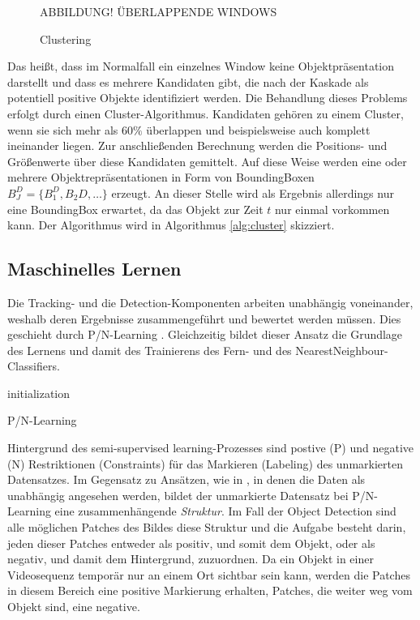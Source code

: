 	\begin{figure}
		\begin{centering}
			ABBILDUNG! ÜBERLAPPENDE WINDOWS
			\caption{Clustering}
			\label{abb:cluster}
			\par
		\end{centering}
	\end{figure}

	Das heißt, dass im Normalfall ein einzelnes Window keine Objektpräsentation darstellt und dass es mehrere Kandidaten gibt, die nach der Kaskade als potentiell positive Objekte identifiziert werden. Die Behandlung dieses Problems erfolgt durch einen Cluster-Algorithmus. Kandidaten gehören zu einem Cluster, wenn sie sich mehr als $60\%$ überlappen und beispielsweise auch komplett ineinander liegen. Zur anschließenden Berechnung werden die Positions- und Größenwerte über diese Kandidaten gemittelt. Auf diese Weise werden eine oder mehrere Objektrepräsentationen in Form von BoundingBoxen $B_J^D = \{B_1^D, B_2D, \dots\}$ erzeugt. An dieser Stelle wird als Ergebnis allerdings nur eine BoundingBox erwartet, da das Objekt zur Zeit $t$ nur einmal vorkommen kann. Der Algorithmus wird in Algorithmus \ref{alg:cluster} skizziert.

	\subsection{Maschinelles Lernen}
	\label{subsection:machine_learning}
	Die Tracking- und die Detection-Komponenten arbeiten unabhängig voneinander, weshalb deren Ergebnisse zusammengeführt und bewertet werden müssen. Dies geschieht durch P/N-Learning \cite{PNL}. Gleichzeitig bildet dieser Ansatz die Grundlage des Lernens und damit des Trainierens
	des Fern- und des NearestNeighbour-Classifiers.

	\begin{algorithm}
	\vspace{0.2cm}
	initialization\;
	\caption{P/N-Learning}
	\label{alg:learning}
	\vspace{0.2cm}
	\end{algorithm}

	Hintergrund des semi-supervised learning-Prozesses sind postive (P)	und negative (N) Restriktionen (Constraints) für das Markieren (Labeling)	des unmarkierten Datensatzes. Im Gegensatz zu Ansätzen, wie in \cite{TCL} \cite{CLU}, in denen die Daten als unabhängig angesehen werden, bildet der unmarkierte Datensatz bei P/N-Learning eine zusammenhängende \textit{Struktur}. Im Fall der Object Detection sind alle möglichen Patches des Bildes diese Struktur und die Aufgabe besteht darin, jeden dieser Patches entweder als positiv, und somit dem Objekt, oder als negativ, und damit dem Hintergrund, zuzuordnen. Da ein Objekt in einer Videosequenz temporär nur an einem Ort sichtbar sein kann, werden die Patches in diesem Bereich eine positive Markierung erhalten, Patches, die weiter weg vom Objekt sind, eine negative.

